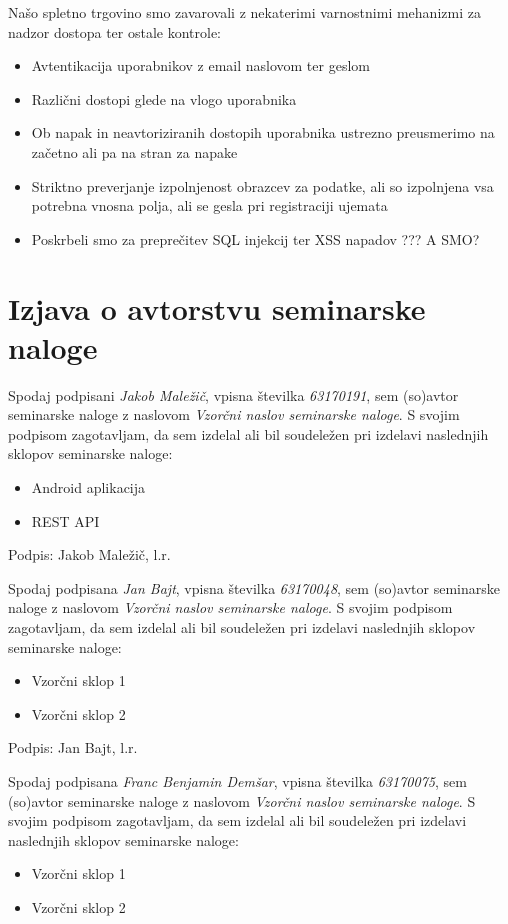 \documentclass[a4paper,12pt]{report}
\newcommand{\naslov}     {Vzorčni naslov seminarske naloge}
\newcommand{\prviavtor}  {Jakob Maležič}
\newcommand{\prviindeks} {63170191}
\newcommand{\drugiavtor} {Jan Bajt}
\newcommand{\drugiindeks}{63170048}
\newcommand{\tretjiavtor} {Franc Benjamin Demšar}
\newcommand{\tretjiindeks}{63170075}
\begin{document}
Našo spletno trgovino smo zavarovali z nekaterimi varnostnimi mehanizmi za nadzor dostopa ter ostale kontrole:
\begin{itemize}
    \item Avtentikacija uporabnikov z email naslovom ter geslom
    \item Različni dostopi glede na vlogo uporabnika
    \item Ob napak in neavtoriziranih dostopih uporabnika ustrezno preusmerimo na začetno ali pa na stran za napake
    \item Striktno preverjanje izpolnjenost obrazcev za podatke, ali so izpolnjena vsa potrebna vnosna polja, ali se gesla pri registraciji ujemata
    \item Poskrbeli smo za preprečitev SQL injekcij ter XSS napadov ??? A SMO?
\end{itemize}


\chapter{Izjava o avtorstvu seminarske naloge}

Spodaj podpisani \textit{\prviavtor}, vpisna številka \textit{\prviindeks}, sem (so)avtor seminarske naloge z naslovom \textit{\naslov}. S svojim podpisom zagotavljam, da sem izdelal ali bil soudeležen pri izdelavi naslednjih sklopov seminarske naloge:
\begin{itemize}
    \item Android aplikacija
	\item REST API
\end{itemize}

Podpis: {\prviavtor}, l.r.

\newpage

Spodaj podpisana \textit{\drugiavtor}, vpisna številka \textit{\drugiindeks}, sem (so)avtor seminarske naloge z naslovom \textit{\naslov}. S svojim podpisom zagotavljam, da sem izdelal ali bil soudeležen pri izdelavi naslednjih sklopov seminarske naloge:
\begin{itemize}
    \item Vzorčni sklop 1
	 \item Vzorčni sklop 2
\end{itemize}

Podpis: {\drugiavtor}, l.r.

\newpage

Spodaj podpisana \textit{\tretjiavtor}, vpisna številka \textit{\tretjiindeks}, sem (so)avtor seminarske naloge z naslovom \textit{\naslov}. S svojim podpisom zagotavljam, da sem izdelal ali bil soudeležen pri izdelavi naslednjih sklopov seminarske naloge:
\begin{itemize}
    \item Vzorčni sklop 1
	 \item Vzorčni sklop 2
\end{itemize}
\end{document}
